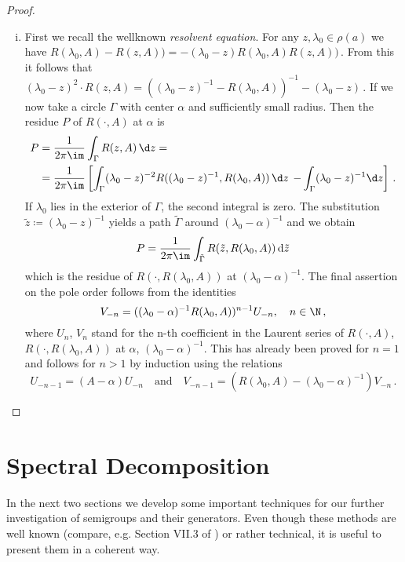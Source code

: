 \begin{proof}
\begin{enumerate}[(i), wide]
\item 
First we recall the wellknown \emph{resolvent equation}. For any $z,\lambda_0 \in \rho(a)$ we have $R(\lambda_0,A) - R(z,A))= -(\lambda_0-z)R(\lambda_0,A)R(z,A))$\,. From this it follows that 
$(\lambda_0-z)^2\cdot R(z,A) = \left((\lambda_0-z)^{-1}-R(\lambda_0,A)\right)^{-1} - (\lambda_0-z)$\,.
If we now take a circle $\Gamma$ with center $\alpha$ and sufficiently small radius. 
Then the residue $P$ of $R(\cdot,A)$ at $\alpha$ is
\begin{align*}
P &=  \frac{1}{2\pi\im } \int_{\Gamma} R(z,A) \, \d z = \\
&=  \frac{1}{2\pi\im } \left[\int_{\Gamma} (\lambda_{0}-z)^{-2}R((\lambda_{0}-z)^{-1},R(\lambda_{0},A)) \, \d z  \right.
\left.-  \int_{\Gamma}(\lambda_{0}-z)^{-1} \d z \right]\,. 
\end{align*}
If $\lambda_{0}$ lies in the exterior of $\Gamma$, the second integral is zero.
The substitution $\tilde{z} \coloneqq (\lambda_{0} - z)^{-1}$ yields a path $\tilde{\Gamma}$ around $(\lambda_{0}-\alpha)^{-1}$ and we obtain
\[
P = \frac{1}{2\pi\im } \int_{\tilde{\Gamma}} R(\tilde{z},R(\lambda_{0},A)) \, \mathrm{d}\tilde{z}
\]
which is the residue of $R(\cdot,R(\lambda_{0},A))$ at $(\lambda_{0}-\alpha)^{-1}$.
The final assertion on the pole order follows from the identities
\[
V_{-n} = ((\lambda_{0}-\alpha)^{-1}R(\lambda_{0},A))^{n-1}U_{-n}, \quad n \in \N\,,
\]
where $U_{n}$, \resp $V_{n}$ stand for the n-th coefficient in the Laurent series of $R(\cdot,A)$, \resp $R(\cdot,R(\lambda_{0},A))$ at $\alpha$, \resp $(\lambda_{0}-\alpha)^{-1}$.
This has already been proved for $n = 1$ and follows for $n > 1$ by induction using the relations
\[
U_{-n-1} = (A - \alpha)U_{-n} \quad \text{and} \quad V_{-n-1} = \left(R(\lambda_{0},A) - (\lambda_{0}-\alpha)^{-1}\right)V_{-n}\,.
\]
\end{enumerate}
\end{proof}
\section{Spectral Decomposition}\label{sec:a3-3}
In the next two sections we develop some important techniques for our further investigation of semigroups and their generators.
Even though these methods are well known (compare, e.g. Section VII.3 of \citet{dunfordschwartz:1958}) or rather technical, it is useful to present them in a coherent way.


